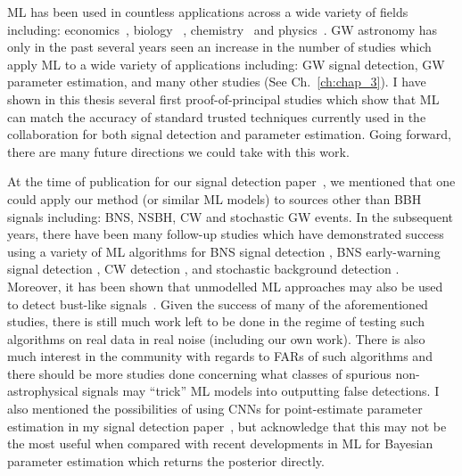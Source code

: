 %
%
\ac{ML} has been used in countless applications across a wide 
variety of fields including: 
economics~\cite{Alexakis2021,Babaei2021,Bouri2021},
biology~\cite{10.3389/fgene.2019.00214,Xu2019,10.1371/journal.pcbi.0030116}
, chemistry~\cite{Tkatchenko2020,Deringer2020,Margraf2021} 
and physics~\cite{Manzhos_2020,2002.09405,50295}. \ac{GW} astronomy has 
only in the past several years seen an increase in the number of studies 
which apply \ac{ML} to a wide variety of applications including: \ac{GW} 
signal detection, \ac{GW} parameter estimation, and many other 
studies (See Ch.~\ref{ch:chap_3}). I have shown in this thesis several first proof-of-principal studies which show that \ac{ML} can match the accuracy of standard trusted techniques currently used in the collaboration for both signal detection and parameter estimation. Going forward, there are many future directions we could take with this work. 

%
%
At the time of publication for our signal detection
paper~\cite{PhysRevLett.120.141103}, we mentioned that one could 
apply our method (or similar \ac{ML} models) to sources 
other than \ac{BBH} signals including: \ac{BNS}, \ac{NSBH}, 
\ac{CW} and stochastic \ac{GW} events. In the subsequent 
years, there have been many follow-up studies which have 
demonstrated success using a variety of \ac{ML} algorithms for 
\ac{BNS} signal detection \cite{PhysRevD.102.063015,
KRASTEV2020135330,Lin2019}, 
\ac{BNS} early-warning signal detection \cite{WEI2021136185}, 
\ac{CW} detection \cite{PhysRevD.100.044009, PhysRevD.102.083024}, 
and stochastic background detection \cite{9461904}. Moreover, 
it has been shown that unmodelled \ac{ML} approaches may also 
be used to detect bust-like signals~\cite{Cavagli__2020,PhysRevD.102.043022}.
Given the success of many of the aforementioned studies, there is 
still much work left to be done in the regime of testing such 
algorithms on real data in real noise (including our own work). 
There is also much interest in the community with regards to \acp{FAR} 
of such algorithms and there should be more studies done concerning what 
classes of spurious non-astrophysical signals may ``trick'' 
\ac{ML} models into outputting false detections. I also mentioned the possibilities of using \acp{CNN} for point-estimate parameter estimation 
in my signal detection paper~\cite{PhysRevLett.120.141103}, 
but acknowledge that this may not be the most useful when 
compared with recent developments in \ac{ML} for Bayesian parameter 
estimation which returns the posterior directly.

